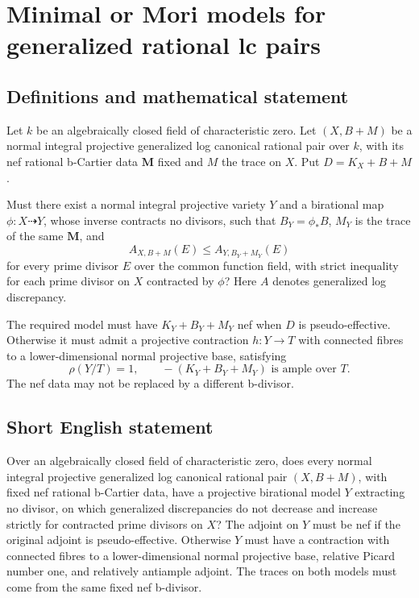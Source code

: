 \documentclass[11pt]{article}
\begin{document}
\section*{Minimal or Mori models for generalized rational lc pairs}\label{statement}
\subsection{Definitions and mathematical statement}
Let \(k\) be an algebraically closed field of characteristic zero. Let \((X,B+M)\) be a normal integral projective generalized log canonical rational pair over \(k\), with its nef rational b-Cartier data \(\mathbf M\) fixed and \(M\) the trace on \(X\). Put \(D=K_X+B+M\).

Must there exist a normal integral projective variety \(Y\) and a birational map \(\phi:X\dashrightarrow Y\), whose inverse contracts no divisors, such that \(B_Y=\phi_*B\), \(M_Y\) is the trace of the same \(\mathbf M\), and
\[
 A_{X,B+M}(E)\le A_{Y,B_Y+M_Y}(E)
\]
for every prime divisor \(E\) over the common function field, with strict inequality for each prime divisor on \(X\) contracted by \(\phi\)? Here \(A\) denotes generalized log discrepancy.

The required model must have \(K_Y+B_Y+M_Y\) nef when \(D\) is pseudo-effective. Otherwise it must admit a projective contraction \(h:Y\to T\) with connected fibres to a lower-dimensional normal projective base, satisfying
\[
 \rho(Y/T)=1,
 \qquad -(K_Y+B_Y+M_Y)\text{ is ample over }T.
\]
The nef data may not be replaced by a different b-divisor.
\subsection{Short English statement}
Over an algebraically closed field of characteristic zero, does every normal integral projective generalized log canonical rational pair \((X,B+M)\), with fixed nef rational b-Cartier data, have a projective birational model \(Y\) extracting no divisor, on which generalized discrepancies do not decrease and increase strictly for contracted prime divisors on \(X\)? The adjoint on \(Y\) must be nef if the original adjoint is pseudo-effective. Otherwise \(Y\) must have a contraction with connected fibres to a lower-dimensional normal projective base, relative Picard number one, and relatively antiample adjoint. The traces on both models must come from the same fixed nef b-divisor.
\end{document}
